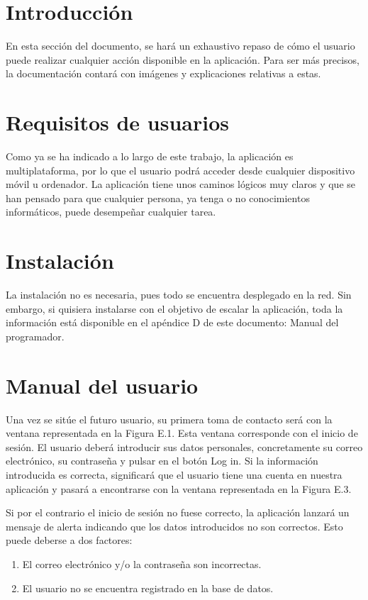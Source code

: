 
\section{Introducción}

	En esta sección del documento, se hará un exhaustivo repaso de cómo el usuario puede realizar cualquier acción disponible en la aplicación. Para ser más precisos, la documentación contará con imágenes y explicaciones relativas a estas.

\section{Requisitos de usuarios}

	Como ya se ha indicado a lo largo de este trabajo, la aplicación es multiplataforma, por lo que el usuario podrá acceder desde cualquier dispositivo móvil u ordenador. La aplicación tiene unos caminos lógicos muy claros y que se han pensado para que cualquier persona, ya tenga o no conocimientos informáticos, puede desempeñar cualquier tarea.

\section{Instalación}

	La instalación no es necesaria, pues todo se encuentra desplegado en la red. Sin embargo, si quisiera instalarse con el objetivo de escalar la aplicación, toda la información está disponible en el apéndice D de este documento: Manual del programador.

\section{Manual del usuario}

	Una vez se sitúe el futuro usuario, su primera toma de contacto será con la ventana representada en la Figura E.1. Esta ventana corresponde con el inicio de sesión. El usuario deberá introducir sus datos personales, concretamente su correo electrónico, su contraseña y pulsar en el botón Log in. Si la información introducida es correcta, significará que el usuario tiene una cuenta en nuestra aplicación y pasará a encontrarse con la ventana representada en la Figura E.3.
	
	
	Si por el contrario el inicio de sesión no fuese correcto, la aplicación lanzará un mensaje de alerta indicando que los datos introducidos no son correctos. Esto puede deberse a dos factores:
	\begin{enumerate}
		\item El correo electrónico y/o la contraseña son incorrectas.
		\item El usuario no se encuentra registrado en la base de datos.
	\end{enumerate}
	
